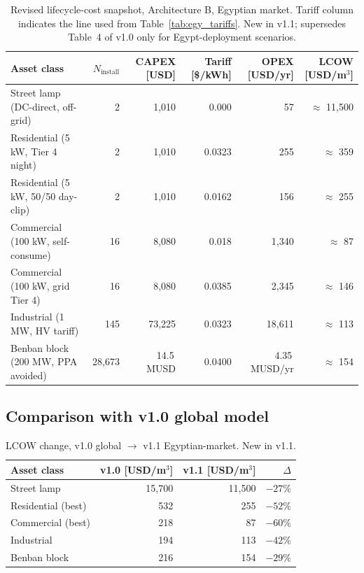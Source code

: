 \documentclass[11pt,a4paper]{article}
\begin{document}
\begin{table}[h]
\centering\small
\caption{Revised lifecycle-cost snapshot, Architecture B, Egyptian market. Tariff column indicates the line used from Table~\ref{tab:egy_tariffs}. New in v1.1; supersedes Table~4 of v1.0 only for Egypt-deployment scenarios.}
\label{tab:lcc_egypt}
\begin{tabular}{@{}lrrrrr@{}}
\toprule
\textbf{Asset class} & \textbf{$N_{\mathrm{install}}$} & \textbf{CAPEX [USD]} & \textbf{Tariff [\$/kWh]} & \textbf{OPEX [USD/yr]} & \textbf{LCOW [USD/m$^3$]}\\
\midrule
Street lamp (DC-direct, off-grid) & 2    & 1{,}010  & 0.000 & 57      & $\approx$ 11{,}500 \\
Residential (5 kW, Tier 4 night)  & 2    & 1{,}010  & 0.0323 & 255     & $\approx$ 359 \\
Residential (5 kW, 50/50 day-clip)& 2    & 1{,}010  & 0.0162 & 156     & $\approx$ 255 \\
Commercial (100 kW, self-consume) & 16   & 8{,}080  & 0.018 & 1{,}340 & $\approx$ 87 \\
Commercial (100 kW, grid Tier 4)  & 16   & 8{,}080  & 0.0385 & 2{,}345 & $\approx$ 146 \\
Industrial (1 MW, HV tariff)      & 145  & 73{,}225 & 0.0323 & 18{,}611 & $\approx$ 113 \\
Benban block (200 MW, PPA avoided) & 28{,}673 & 14.5\,MUSD & 0.0400 & 4.35\,MUSD/yr & $\approx$ 154 \\
\bottomrule
\end{tabular}
\end{table}

\subsection{Comparison with v1.0 global model}
\begin{table}[h]
\centering\small
\caption{LCOW change, v1.0 global $\rightarrow$ v1.1 Egyptian-market. New in v1.1.}
\label{tab:lcc_delta}
\begin{tabular}{@{}lrrr@{}}
\toprule
\textbf{Asset class} & \textbf{v1.0 [USD/m$^3$]} & \textbf{v1.1 [USD/m$^3$]} & \textbf{$\Delta$}\\
\midrule
Street lamp         & 15{,}700 & 11{,}500 & $-27\%$ \\
Residential (best)  & 532    & 255    & $-52\%$ \\
Commercial (best)   & 218    & 87     & $-60\%$ \\
Industrial          & 194    & 113    & $-42\%$ \\
Benban block        & 216    & 154    & $-29\%$ \\
\bottomrule
\end{tabular}
\end{table}
\end{document}
